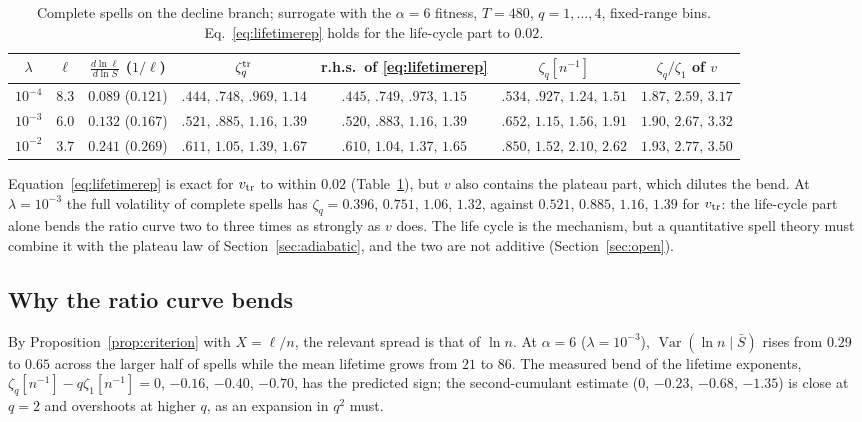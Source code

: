 \documentclass[11pt]{article}
\newcommand{\Var}{\operatorname{Var}}
\begin{document}
\begin{table}[htbp]
\centering\footnotesize\setlength{\tabcolsep}{2.5pt}
\begin{tabular}{c|cc|c|c|c|c}
\toprule
$\lambda$ & $\ell$ & $\frac{d\ln\ell}{d\ln S}$ ($1/\ell$) & $\zeta_q^{\rm tr}$ & r.h.s.\ of \eqref{eq:lifetimerep} & $\zeta_q[n^{-1}]$ & $\zeta_q/\zeta_1$ of $v$\\
\midrule
$10^{-4}$ & $8.3$ & $0.089$ ($0.121$) & $.444,\,.748,\,.969,\,1.14$ & $.445,\,.749,\,.973,\,1.15$ & $.534,\,.927,\,1.24,\,1.51$ & $1.87,\,2.59,\,3.17$\\
$10^{-3}$ & $6.0$ & $0.132$ ($0.167$) & $.521,\,.885,\,1.16,\,1.39$ & $.520,\,.883,\,1.16,\,1.39$ & $.652,\,1.15,\,1.56,\,1.91$ & $1.90,\,2.67,\,3.32$\\
$10^{-2}$ & $3.7$ & $0.241$ ($0.269$) & $.611,\,1.05,\,1.39,\,1.67$ & $.610,\,1.04,\,1.37,\,1.65$ & $.850,\,1.52,\,2.10,\,2.62$ & $1.93,\,2.77,\,3.50$\\
\bottomrule
\end{tabular}
\caption{Complete spells on the decline branch; surrogate with the $\alpha=6$ fitness, $T=480$,
$q=1,\dots,4$, fixed-range bins.  Eq.~\eqref{eq:lifetimerep} holds for the life-cycle part to $0.02$.}
\label{tab:lifetime}
\end{table}

Equation~\eqref{eq:lifetimerep} is exact for $v_{\rm tr}$ to within $0.02$
(Table~\ref{tab:lifetime}), but $v$ also contains the plateau part, which dilutes the bend.  At
$\lambda=10^{-3}$ the full volatility of complete spells has $\zeta_q=0.396$, $0.751$, $1.06$, $1.32$,
against $0.521$, $0.885$, $1.16$, $1.39$ for $v_{\rm tr}$: the life-cycle part alone bends the ratio
curve two to three times as strongly as $v$ does.  The life cycle is the mechanism, but a quantitative spell
theory must combine it with the plateau law of Section~\ref{sec:adiabatic}, and the two are not
additive (Section~\ref{sec:open}).

\subsection{Why the ratio curve bends}

By Proposition~\ref{prop:criterion} with $X=\ell/n$, the relevant spread is that of $\ln n$.  At
$\alpha=6$ ($\lambda=10^{-3}$), $\Var(\ln n\mid\bar S)$ rises from $0.29$ to $0.65$ across the larger
half of spells while the mean lifetime grows from $21$ to $86$.  The measured bend of the lifetime
exponents, $\zeta_q[n^{-1}]-q\zeta_1[n^{-1}]=0$, $-0.16$, $-0.40$, $-0.70$, has the predicted sign;
the second-cumulant estimate ($0$, $-0.23$, $-0.68$, $-1.35$) is close at $q=2$ and overshoots at
higher $q$, as an expansion in $q^2$ must.
\end{document}
